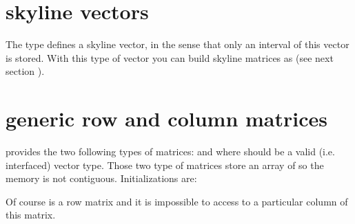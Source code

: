 \documentclass[a4paper,11pt,english]{sphinxmanual}
\begin{document}
\section{skyline vectors}
\label{\detokenize{gmm/matrix:skyline-vectors}}
\sphinxAtStartPar
The type  defines a skyline vector, in the sense that only an interval of this vector is stored. With this type of vector you can build skyline matrices as  (see next section {\hyperref[\detokenize{gmm/matrix:gmmracmat}]{}}).


\section{generic row and column matrices}
\label{\detokenize{gmm/matrix:generic-row-and-column-matrices}}\label{\detokenize{gmm/matrix:gmmracmat}}
\sphinxAtStartPar
{} provides the two following types of matrices:  and  where  should be a valid (i.e. interfaced) vector type.
Those two type of matrices store an array of  so the memory is not contiguous. Initializations are:

\begin{sphinxVerbatim}[commandchars=\\\{\}]
      
     
\end{sphinxVerbatim}

\sphinxAtStartPar
Of course  is a row matrix and it is impossible to access to a particular column of this matrix.
\end{document}
